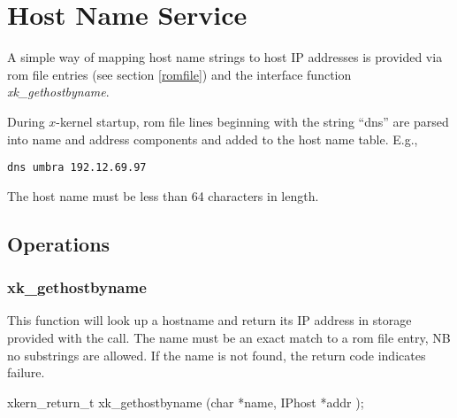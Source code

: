 % 
%
%

\section{Host Name Service}
\label{dns}
A simple way of mapping host name strings to host IP addresses is
provided via rom file entries (see section \ref{romfile}) and the interface
function {\em xk\_gethostbyname}.

During $x$-kernel startup, rom file lines beginning with
the string ``dns'' are parsed into name and address components
and added to the host name table.  E.g., 

\begin{verbatim}
dns umbra 192.12.69.97
\end{verbatim}

The host name must be less than 64 characters in length.

\subsection{Operations}
\subsubsection{xk\_gethostbyname}

This function will look up a hostname and return its IP address in
storage provided with the call.
The name must be an exact match to a rom file entry, NB no substrings
are allowed.  If the name is not found, the return code indicates
failure.
\medskip

{\sem xkern\_return\_t} {\bold xk\_gethostbyname} ({\sem char} *{\caps name}, 
{\sem IPhost} *{\caps addr} );

